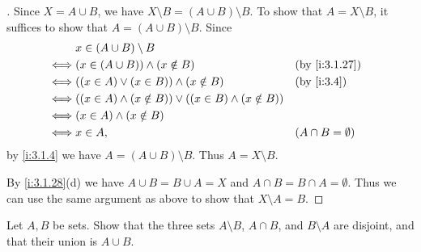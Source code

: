 \begin{proof}[]
  Since \(X = A \cup B\), we have \(X \setminus B = (A \cup B) \setminus B\).
  To show that \(A = X \setminus B\), it suffices to show that \(A = (A \cup B) \setminus B\).
  Since
  \begin{align*}
         & x \in (A \cup B) \setminus B                                                                   \\
    \iff & (x \in (A \cup B)) \land (x \notin B)                              &  & \by{i:3.1.27}          \\
    \iff & ((x \in A) \lor (x \in B)) \land (x \notin B)                      &  & \by{i:3.4}             \\
    \iff & ((x \in A) \land (x \notin B)) \lor ((x \in B) \land (x \notin B))                             \\
    \iff & (x \in A) \land (x \notin B)                                                                   \\
    \iff & x \in A,                                                           &  & (A \cap B = \emptyset)
  \end{align*}
  by \cref{i:3.1.4} we have \(A = (A \cup B) \setminus B\).
  Thus \(A = X \setminus B\).

  By \cref{i:3.1.28}(d) we have \(A \cup B = B \cup A = X\) and \(A \cap B = B \cap A = \emptyset\).
  Thus we can use the same argument as above to show that \(X \setminus A = B\).
\end{proof}

\begin{ex}\label{i:ex:3.1.10}
  Let \(A, B\) be sets.
  Show that the three sets \(A \setminus B\), \(A \cap B\), and \(B \setminus A\) are disjoint, and that their union is \(A \cup B\).
\end{ex}


